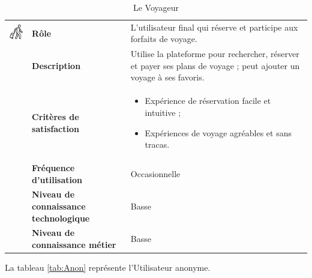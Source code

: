 \documentclass[12pt]{report}
\begin{document}
				\begin{longtable}{|p{3cm}|p{4cm}|p{7cm}|}
				  \caption{Le Voyageur}
				  \label{tab:Voyageur}\\
				  \hline
				\endfirsthead
				\hline
				\endhead
				\begin{minipage}{3cm}
					\includegraphics[width=2cm]{voyageur.png}
				\end{minipage} & \textbf{Rôle} & L'utilisateur final qui réserve et participe aux forfaits de voyage.\\ \cline{2-3}
						& \textbf{Description} & Utilise la plateforme pour rechercher, réserver et payer ses plans de voyage ; peut ajouter un voyage à ses favoris. \\ \cline{2-3}
						& \textbf{Critères de satisfaction} & \begin{itemize}
																\item Expérience de réservation facile et intuitive ;
																\item Expériences de voyage agréables et sans tracas.
															\end{itemize}\\ \cline{2-3}
						& \textbf{Fréquence d’utilisation} & Occasionnelle \\ \cline{2-3}
						& \textbf{Niveau de connaissance technologique} & Basse \\ \cline{2-3}
						& \textbf{Niveau de connaissance métier} & Basse \\ 
				\hline
				\end{longtable}
				\FloatBarrier

				La tableau \ref{tab:Anon} représente l'Utilisateur anonyme.
			
\end{document}
